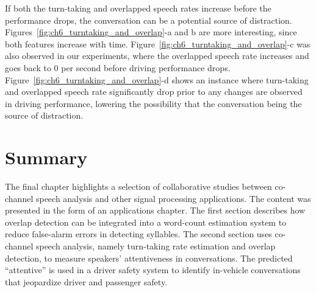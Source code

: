 \newpage
If both the turn-taking and overlapped speech rates increase before the performance drops, the conversation can be a potential source of distraction. 
Figures~\ref{fig:ch6_turntaking_and_overlap}-a and b are more interesting, since both features increase with time. 
Figure~\ref{fig:ch6_turntaking_and_overlap}-c was also observed in our experiments, where the overlapped speech rate increases and goes back to $0$ per second before driving performance drops. 
Figure~\ref{fig:ch6_turntaking_and_overlap}-d shows an instance where turn-taking and overlapped speech rate significantly drop prior to any changes are observed in driving performance, lowering the possibility that the conversation being the source of distraction. 


\section{Summary}
\label{sec:ch4_summary}
The final chapter highlights a selection of collaborative studies between co-channel speech analysis and other signal processing applications. 
The content was presented in the form of an applications chapter. 
The first section describes how overlap detection can be integrated into a word-count estimation system to reduce false-alarm errors in detecting syllables. 
The second section uses co-channel speech analysis, namely turn-taking rate estimation and overlap detection, to measure speakers' attentiveness in conversations. 
The predicted ``attentive'' is used in a driver safety system to identify in-vehicle conversations that jeopardize driver and passenger safety. 
